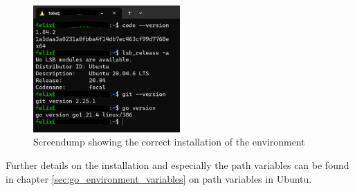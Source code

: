 \begin{figure}[H]
	\centering
	\includegraphics[width=0.5\textwidth]{figures/goLang/installation_screendump.png}
	\caption{Screendump showing the correct installation of the environment}
	\label{fig:screendump_installation}
\end{figure}

Further details on the installation and especially the path variables can be found in chapter \ref*{sec:go_environment_variables} on path variables in Ubuntu.